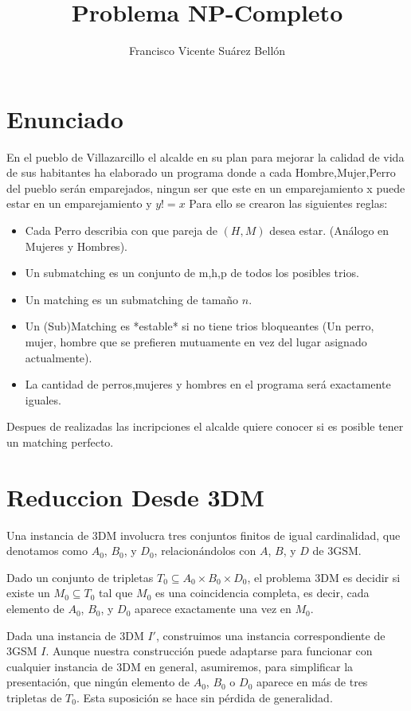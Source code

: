 \documentclass{article}
\title{Problema NP-Completo}
\author{Francisco Vicente Suárez Bellón}
\date{}
\begin{document}
\maketitle
\section{Enunciado}
En el pueblo de Villazarcillo el alcalde en su plan para mejorar la 
calidad de vida de sus habitantes ha elaborado un programa donde a cada Hombre,Mujer,Perro
del pueblo serán emparejados, ningun ser que este en un emparejamiento x puede estar en un emparejamiento y $y!=x$
Para ello se crearon las siguientes reglas:
\begin{itemize}
    \item Cada Perro describia con que pareja de $(H,M)$ desea estar. (Análogo en Mujeres y Hombres).
    \item Un submatching es un conjunto de m,h,p de todos los posibles trios.
    \item Un matching es un submatching de tamaño $n$.
    \item Un (Sub)Matching es *estable* si no tiene trios bloqueantes (Un perro, mujer, hombre que se prefieren mutuamente en vez del lugar asignado actualmente).
    \item La cantidad de perros,mujeres y hombres en el programa será exactamente iguales.
\end{itemize}
Despues de realizadas las incripciones el alcalde quiere conocer si es posible tener un matching perfecto.


\section*{Reduccion Desde 3DM}

Una instancia de 3DM involucra tres conjuntos finitos de igual cardinalidad, que denotamos como $A_0$, $B_0$, y $D_0$, relacionándolos con $A$, $B$, y $D$ de 3GSM. 

Dado un conjunto de tripletas $T_0 \subseteq A_0 \times B_0 \times D_0$, el problema 3DM es decidir si existe un $M_0 \subseteq T_0$ tal que $M_0$ es una coincidencia completa, es decir, cada elemento de $A_0$, $B_0$, y $D_0$ aparece exactamente una vez en $M_0$.

Dada una instancia de 3DM $I'$, construimos una instancia correspondiente de 3GSM $I$. Aunque nuestra construcción puede adaptarse para funcionar con cualquier instancia de 3DM en general, asumiremos, para simplificar la presentación, que ningún elemento de $A_0$, $B_0$ o $D_0$ aparece en más de tres tripletas de $T_0$. Esta suposición se hace sin pérdida de generalidad.
\end{document}
